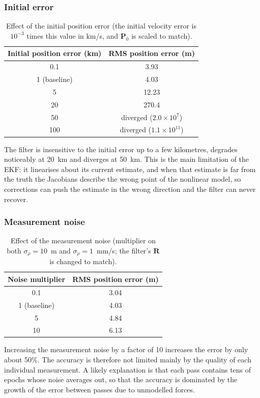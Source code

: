 \documentclass[11pt,a4paper]{article}
\newcommand{\bP}{\mathbf{P}}
\newcommand{\bR}{\mathbf{R}}
\begin{document}
\subsubsection{Initial error}
\begin{table}[H]
\centering
\caption{Effect of the initial position error (the initial velocity error is $10^{-3}$ times this value in km/s, and $\bP_0$ is scaled to match).}
\label{tab:init}
\begin{tabular}{cc}
\toprule
\textbf{Initial position error (km)} & \textbf{RMS position error (m)} \\
\midrule
0.1 & 3.93 \\
1 (baseline) & 4.03 \\
5 & 12.23 \\
20 & 270.4 \\
50 & diverged ($2.0\times10^{7}$) \\
100 & diverged ($1.1\times10^{11}$) \\
\bottomrule
\end{tabular}
\end{table}
The filter is insensitive to the initial error up to a few kilometres, degrades noticeably at 20~km and diverges at 50~km. This is the main limitation of the EKF: it linearises about its current estimate, and when that estimate is far from the truth the Jacobians describe the wrong point of the nonlinear model, so corrections can push the estimate in the wrong direction and the filter can never recover.

\subsubsection{Measurement noise}
\begin{table}[H]
\centering
\caption{Effect of the measurement noise (multiplier on both $\sigma_\rho=10$~m and $\sigma_{\dot\rho}=1$~mm/s; the filter's $\bR$ is changed to match).}
\label{tab:noise}
\begin{tabular}{cc}
\toprule
\textbf{Noise multiplier} & \textbf{RMS position error (m)} \\
\midrule
0.1 & 3.04 \\
1 (baseline) & 4.03 \\
5 & 4.84 \\
10 & 6.13 \\
\bottomrule
\end{tabular}
\end{table}
Increasing the measurement noise by a factor of 10 increases the error by only about 50\%. The accuracy is therefore not limited mainly by the quality of each individual measurement. A likely explanation is that each pass contains tens of epochs whose noise averages out, so that the accuracy is dominated by the growth of the error between passes due to unmodelled forces.
\end{document}
